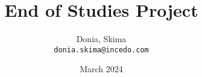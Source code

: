 \usepackage[utf8]{inputenc}
\usepackage{glossaries-extra}

\title{End of Studies Project}
\author{
    Donia, Skima\\
    \texttt{donia.skima@incedo.com}
}
\date{March 2024}

\usepackage{pdfpages}
\usepackage{natbib}
\usepackage{graphicx}
\usepackage{epstopdf}
\usepackage{float}
\usepackage{tabularx}
\usepackage{colortbl}
\usepackage{multirow}
\usepackage{caption}
\usepackage{chngcntr}
\usepackage[hyphens]{url}
\usepackage{listings}
\usepackage{color}
\usepackage{textcomp}
\usepackage[toc,page]{appendix}
\usepackage{ragged2e}
\usepackage{enumitem}
\usepackage[parfill]{parskip} %
\usepackage{fancyhdr}
\usepackage[nohints]{minitoc}

\usepackage{lipsum} %
